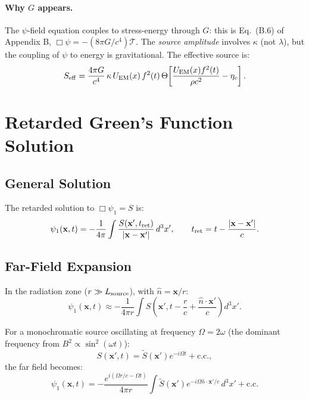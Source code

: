 \documentclass[11pt]{article}
\newcommand{\etac}{\eta_c}
\begin{document}
\paragraph{Why $G$ appears.}
The $\psi$-field equation couples to stress-energy through $G$: this is
Eq.~(B.6) of Appendix B, $\Box\psi = -(8\pi G/c^4)\mathcal{T}$. The
\emph{source amplitude} involves $\kappa$ (not $\lambda$), but the coupling
of $\psi$ to energy is gravitational. The effective source is:
\begin{equation}
S_{\rm eff} = \frac{4\pi G}{c^4}\,\kappa\,U_{\rm EM}(x)\,f^2(t)\,
  \Theta\!\left[\frac{U_{\rm EM}(x) f^2(t)}{\rho c^2} - \etac\right].
\end{equation}

\section{Retarded Green's Function Solution}\label{sec:greens}

\subsection{General Solution}

The retarded solution to $\Box\psi_1 = S$ is:
\begin{equation}\label{eq:retarded}
\psi_1(\mathbf{x}, t) = -\frac{1}{4\pi} \int
  \frac{S(\mathbf{x}', t_{\rm ret})}{|\mathbf{x} - \mathbf{x}'|}\,d^3x',
  \qquad t_{\rm ret} = t - \frac{|\mathbf{x} - \mathbf{x}'|}{c}.
\end{equation}

\subsection{Far-Field Expansion}

In the radiation zone ($r \gg L_{\rm source}$), with $\hat{n} = \mathbf{x}/r$:
\begin{equation}
\psi_1(\mathbf{x}, t) \approx -\frac{1}{4\pi r} \int
  S\!\left(\mathbf{x}', t - \frac{r}{c} + \frac{\hat{n}\cdot\mathbf{x}'}{c}\right) d^3x'.
\end{equation}

For a monochromatic source oscillating at frequency $\Omega = 2\omega$
(the dominant frequency from $B^2 \propto \sin^2(\omega t)$):
\begin{equation}
S(\mathbf{x}', t) = \tilde{S}(\mathbf{x}') e^{-i\Omega t} + \text{c.c.},
\end{equation}
the far field becomes:
\begin{equation}\label{eq:far-field}
\psi_1(\mathbf{x}, t) = -\frac{e^{i(\Omega r/c - \Omega t)}}{4\pi r}
  \int \tilde{S}(\mathbf{x}') e^{-i\Omega\hat{n}\cdot\mathbf{x}'/c}\,d^3x'
  + \text{c.c.}
\end{equation}
\end{document}
